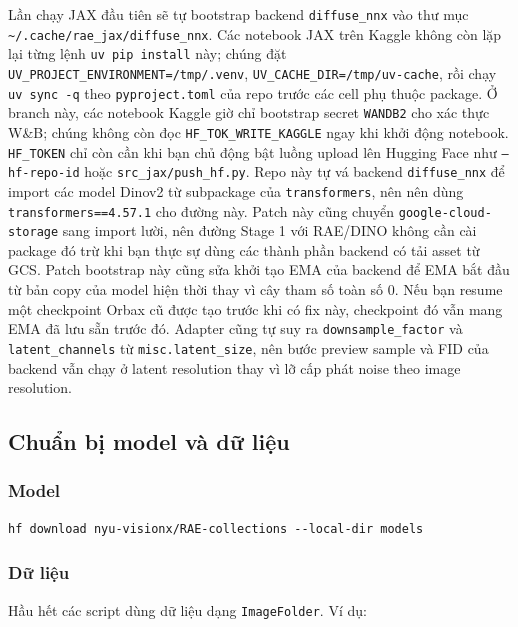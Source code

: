 Lần chạy JAX đầu tiên sẽ tự bootstrap backend \texttt{diffuse\_nnx} vào thư mục
\texttt{\~{}/.cache/rae\_jax/diffuse\_nnx}.
Các notebook JAX trên Kaggle không còn lặp lại từng lệnh \texttt{uv pip install}
này; chúng đặt \texttt{UV\_PROJECT\_ENVIRONMENT=/tmp/.venv},
\texttt{UV\_CACHE\_DIR=/tmp/uv-cache}, rồi chạy \texttt{uv sync -q} theo
\texttt{pyproject.toml} của repo trước các cell phụ thuộc package. Ở branch này,
các notebook Kaggle giờ chỉ bootstrap secret \texttt{WANDB2} cho xác thực W\&B;
chúng không còn đọc \texttt{HF\_TOK\_WRITE\_KAGGLE} ngay khi khởi động notebook.
\texttt{HF\_TOKEN} chỉ còn cần khi bạn chủ động bật luồng upload lên
Hugging Face như \texttt{--hf-repo-id} hoặc \texttt{src\_jax/push\_hf.py}.
Repo này tự vá backend \texttt{diffuse\_nnx} để import các model Dinov2 từ
subpackage của \texttt{transformers}, nên nên dùng
\texttt{transformers==4.57.1} cho đường này.
Patch này cũng chuyển \texttt{google-cloud-storage} sang import lười, nên đường
Stage 1 với RAE/DINO không cần cài package đó trừ khi bạn thực sự dùng các
thành phần backend có tải asset từ GCS.
Patch bootstrap này cũng sửa khởi tạo EMA của backend để EMA bắt đầu từ bản
copy của model hiện thời thay vì cây tham số toàn số 0. Nếu bạn resume một
checkpoint Orbax cũ được tạo trước khi có fix này, checkpoint đó vẫn mang EMA
đã lưu sẵn trước đó.
Adapter cũng tự suy ra \texttt{downsample\_factor} và \texttt{latent\_channels}
từ \texttt{misc.latent\_size}, nên bước preview sample và FID của backend vẫn
chạy ở latent resolution thay vì lỡ cấp phát noise theo image resolution.

\subsection{Chuẩn bị model và dữ liệu}

\subsubsection{Model}

\begin{lstlisting}[style=rae]
hf download nyu-visionx/RAE-collections --local-dir models
\end{lstlisting}

\subsubsection{Dữ liệu}

Hầu hết các script dùng dữ liệu dạng \texttt{ImageFolder}. Ví dụ:

